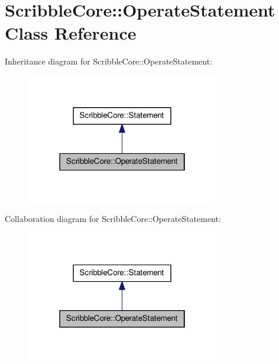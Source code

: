 \hypertarget{class_scribble_core_1_1_operate_statement}{\section{Scribble\-Core\-:\-:Operate\-Statement Class Reference}
\label{class_scribble_core_1_1_operate_statement}
}


Inheritance diagram for Scribble\-Core\-:\-:Operate\-Statement\-:
\nopagebreak
\begin{figure}[H]
\begin{center}
\leavevmode
\includegraphics[width=238pt]{class_scribble_core_1_1_operate_statement__inherit__graph}
\end{center}
\end{figure}


Collaboration diagram for Scribble\-Core\-:\-:Operate\-Statement\-:
\nopagebreak
\begin{figure}[H]
\begin{center}
\leavevmode
\includegraphics[width=238pt]{class_scribble_core_1_1_operate_statement__coll__graph}
\end{center}
\end{figure}
